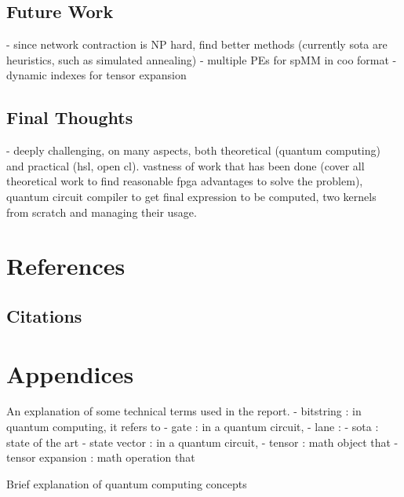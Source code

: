 \documentclass[12pt,oneside,a4paper]{article}
\begin{document}
\subsection{Future Work}
- since network contraction is NP hard, find better methods (currently sota are heuristics, such as simulated annealing)
- multiple PEs for spMM in coo format
- dynamic indexes for tensor expansion

\subsection{Final Thoughts}
- deeply challenging, on many aspects, both theoretical (quantum computing) and practical (hsl, open cl). vastness of work that has been done (cover all theoretical work to find reasonable fpga advantages to solve the problem), quantum circuit compiler to get final expression to be computed, two kernels from scratch and managing their usage.





\section{References} 

\subsection{Citations}





\section{Appendices}
An explanation of some technical terms used in the report.
- bitstring : in quantum computing, it refers to
- gate : in a quantum circuit,
- lane : 
- sota : state of the art
- state vector : in a quantum circuit, 
- tensor : math object that
- tensor expansion : math operation that

Brief explanation of quantum computing concepts


\end{document}
